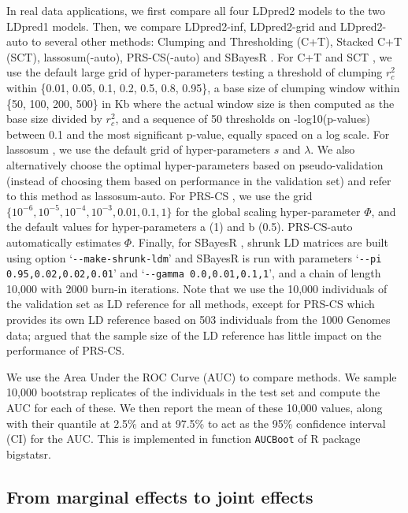 \documentclass{bioinfo}
\begin{document}
\begin{methods}
In real data applications, we first compare all four LDpred2 models to the two LDpred1 models.
Then, we compare LDpred2-inf, LDpred2-grid and LDpred2-auto to several other methods: Clumping and Thresholding (C+T), Stacked C+T (SCT), lassosum(-auto), PRS-CS(-auto) and SBayesR \cite[]{prive2019making,mak2017polygenic,ge2019polygenic,lloyd2019improved}.
For C+T and SCT \cite[]{prive2019making}, we use the default large grid of hyper-parameters testing a threshold of clumping $r_c^2$ within \{0.01, 0.05, 0.1, 0.2, 0.5, 0.8, 0.95\}, a base size of clumping window within \{50, 100, 200, 500\} in Kb where the actual window size is then computed as the base size divided by $r_c^2$, and a sequence of 50 thresholds on -log10(p-values) between 0.1 and the most significant p-value, equally spaced on a log scale.
For lassosum \cite[]{mak2017polygenic}, we use the default grid of hyper-parameters $s$ and $\lambda$. 
We also alternatively choose the optimal hyper-parameters based on pseudo-validation (instead of choosing them based on performance in the validation set) and refer to this method as lassosum-auto.
For PRS-CS \cite[]{ge2019polygenic}, we use the grid $\{10^{-6}, 10^{-5}, 10^{-4}, 10^{-3}, 0.01, 0.1, 1\}$ for the global scaling hyper-parameter $\Phi$, and the default values for hyper-parameters a (1) and b (0.5). PRS-CS-auto automatically estimates $\Phi$.
Finally, for SBayesR \cite[]{lloyd2019improved}, shrunk LD matrices are built using option `\texttt{-{}-make-shrunk-ldm}' and SBayesR is run with parameters `\texttt{-{}-pi 0.95,0.02,0.02,0.01}' and `\texttt{-{}-gamma 0.0,0.01,0.1,1}', and a chain of length 10,000 with 2000 burn-in iterations.
Note that we use the 10,000 individuals of the validation set as LD reference for all methods, except for PRS-CS which provides its own LD reference based on 503 individuals from the 1000 Genomes data; \cite{ge2019polygenic} argued that the sample size of the LD reference has little impact on the performance of PRS-CS.

We use the Area Under the ROC Curve (AUC) to compare methods.
We sample 10,000 bootstrap replicates of the individuals in the test set and compute the AUC for each of these. 
We then report the mean of these 10,000 values, along with their quantile at 2.5\% and at 97.5\% to act as the 95\% confidence interval (CI) for the AUC.
This is implemented in function \texttt{AUCBoot} of R package bigstatsr.


\subsection*{From marginal effects to joint effects}


\end{methods}
\end{document}
